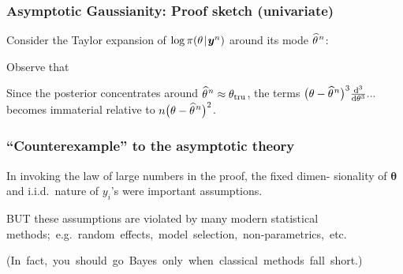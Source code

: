 \documentclass[18pt]{beamer}
\newcommand{\defineTightItemizeSpacing}{%
	\setlength{\abovedisplayskip}{.25\baselineskip}%
	\setlength{\belowdisplayskip}{.25\baselineskip}%
}
\newenvironment{tightEquation*}{%
	\defineTightItemizeSpacing%
	\begin{equation*}
}{
	\end{equation*} \ignorespacesafterend
}
\newcommand{\given}{\thinnerspace | \thinnerspace}
\newcommand{\diff}{\operatorname{\mathrm{d}}\!{}}
\newcommand{\thinnerspace}{\mskip.5\thinmuskip}
\newcommand{\expectation}{\mathbb{E}}
\newcommand{\truthSub}{\mathrm{tru}}
\newcommand{\density}{\pi}
\newcommand{\likelihood}{L}
\newcommand{\by}{\bm{y}}
\newcommand{\btheta}{\bm{\theta}}
\begin{document}
\newcommand{\samplesizeDependentMap}{\widehat{\theta}^{\text{\raisebox{.1ex}{$\thinnerspace n$}}}}
\begin{frame}
\frametitle{Asymptotic Gaussianity: Proof sketch (univariate)}
Consider the Taylor expansion of $\log \density(\theta \given \by^n)$ around its mode $\samplesizeDependentMap$:
\begin{tightEquation*}
\end{tightEquation*}
\pause%
Observe that 
\begin{tightEquation*}
\end{tightEquation*}
\pause%
Since the posterior concentrates around $\samplesizeDependentMap \approx \theta_\truthSub$, the terms $\big( \theta - \samplesizeDependentMap \big)^3 \frac{\diff^3}{\diff \theta^3} ...$ becomes immaterial relative to $n \big( \theta - \samplesizeDependentMap \big)^2$. 
\pause%
\hfill \qedsymbol
\end{frame}

\begin{frame}
\frametitle{``Counterexample'' to the asymptotic theory}
In invoking the law of large numbers in the proof, the fixed dimen- sionality of $\btheta$ and i.i.d.\ nature of $y_i$'s were important assumptions.

\pause%
B{\small UT} these assumptions are violated by many modern statistical \mbox{methods; e.g.\ random effects, model selection, non-parametrics, etc.}

\pause%
\mbox{(In fact, you should go Bayes only when classical methods fall short.)}
\end{frame}
\end{document}

